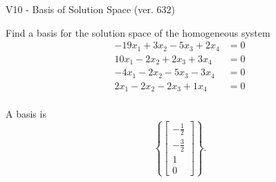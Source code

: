 \begin{exercise}
  \begin{exerciseTitle}V10 - Basis of Solution Space (ver. 632)\end{exerciseTitle}
  \begin{exerciseStatement}
    Find a basis for the solution space of the homogeneous system 
\begin{align*}
 -19 x_ 1 + 3 x_ 2 -5 x_ 3 + 2 x_ 4 &= 0  \\ 
  10 x_ 1 -2 x_ 2 + 2 x_ 3 + 3 x_ 4 &= 0  \\ 
  -4 x_ 1 -2 x_ 2 -5 x_ 3 -3 x_ 4 &= 0  \\ 
  2 x_ 1 -2 x_ 2 -2 x_ 3 + 1 x_ 4 &= 0  \\ 
 \end{align*}


 
  \end{exerciseStatement}

  \begin{exerciseAnswer}
   A basis is   
\[\left\{\left[\begin{array}{c}
-\frac{1}{2} \\
-\frac{3}{2} \\
1 \\
0
\end{array}\right]\right\}.\]

  


  \end{exerciseAnswer}
\end{exercise}
